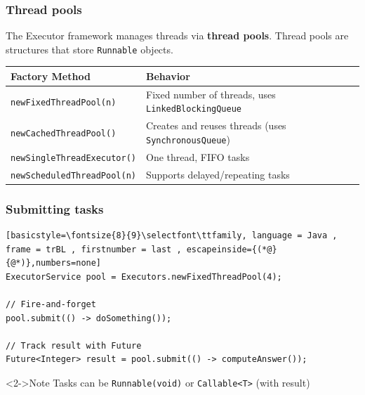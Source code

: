 \documentclass[xcolor={dvipsnames,svgnames},aspectratio=169]{beamer}
\begin{document}
\begin{frame}[fragile]
  \frametitle{Thread pools}

  The Executor framework manages threads via \textbf{thread pools}. Thread pools
  are structures that store \texttt{Runnable} objects.

  \begin{table}[]
    \centering
    \begin{tabular}{l|l|}
      \toprule
      \textbf{Factory Method}
      & \textbf{Behavior}
        \\
      \midrule
      \texttt{newFixedThreadPool(n)}
      & Fixed number of threads, uses \texttt{LinkedBlockingQueue}\\
      \midrule
      \texttt{newCachedThreadPool()}
      & Creates and reuses threads (uses \texttt{SynchronousQueue})\\
      \midrule
      \texttt{newSingleThreadExecutor()}
      & One thread, FIFO tasks\\
      \midrule
      \texttt{newScheduledThreadPool(n)}
      & Supports delayed/repeating tasks\\
      \bottomrule
    \end{tabular}
  \end{table}

\end{frame}

\begin{frame}[fragile]
  \frametitle{Submitting tasks}

\begin{lstlisting}[basicstyle=\fontsize{8}{9}\selectfont\ttfamily, language = Java ,
frame = trBL , firstnumber = last , escapeinside={(*@}{@*)},numbers=none]
ExecutorService pool = Executors.newFixedThreadPool(4);

// Fire-and-forget
pool.submit(() -> doSomething());

// Track result with Future
Future<Integer> result = pool.submit(() -> computeAnswer());
\end{lstlisting}

  \begin{block}<2->{\faLightbulb \quad Note}
    Tasks can be \texttt{Runnable(void)} or \texttt{Callable<T>} (with result)
  \end{block}

\end{frame}
\end{document}

